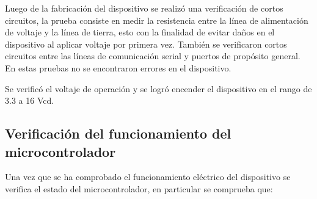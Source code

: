 Luego de la fabricaci\'on del dispositivo se realiz\'o una verificaci\'on de cortos circuitos, la prueba consiste en medir la resistencia entre la l\'inea de alimentaci\'on de voltaje y la l\'inea de tierra, esto con la finalidad de evitar da\~nos en el dispositivo al aplicar voltaje por primera vez. Tambi\'en se verificaron cortos circuitos entre las l\'ineas de comunicaci\'on serial y puertos de prop\'osito general. En estas pruebas no se encontraron errores en el dispositivo. 


Se verific\'o el voltaje de operaci\'on y se logr\'o encender el dispositivo en el rango de 3.3 a 16 Vcd.





\subsection{Verificaci\'on del funcionamiento del microcontrolador}

Una vez que se ha comprobado el funcionamiento el\'ectrico del dispositivo se verifica el estado del microcontrolador, en particular se comprueba que: 

